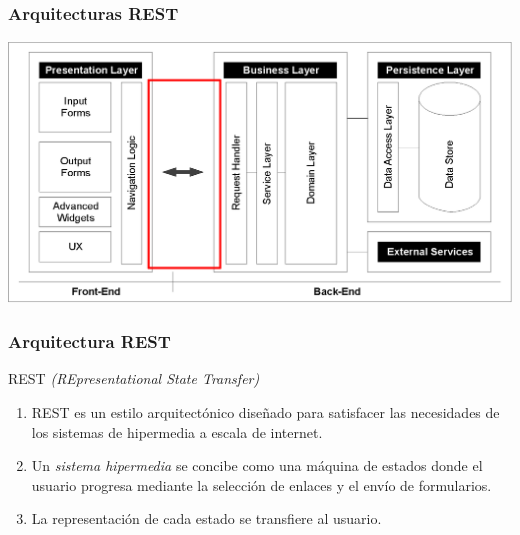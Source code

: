 \documentclass[a4paper,slidestop,xcolor=pst,blue]{beamer}
\begin{document}
\begin{frame}
    \frametitle{Arquitecturas REST}
    \begin{center}
        \includegraphics[width=\linewidth]{images/rest/enterpriseArchitectures(rest).eps}
    \end{center}
\end{frame}

\begin{frame}[c]
	\frametitle{Arquitectura REST}
    \begin{block}{REST \emph{(REpresentational State Transfer)}}
        \begin{enumerate}[<+->]
            \item  REST es un estilo arquitectónico diseñado para satisfacer las necesidades de los sistemas de hipermedia a escala de internet.
            \item Un \emph{sistema hipermedia} se concibe como una máquina de estados donde el usuario progresa mediante la selección de enlaces y el envío de formularios.
            \item La representación de cada estado se transfiere al usuario.
        \end{enumerate}
    \end{block}
\end{frame}
\end{document}
